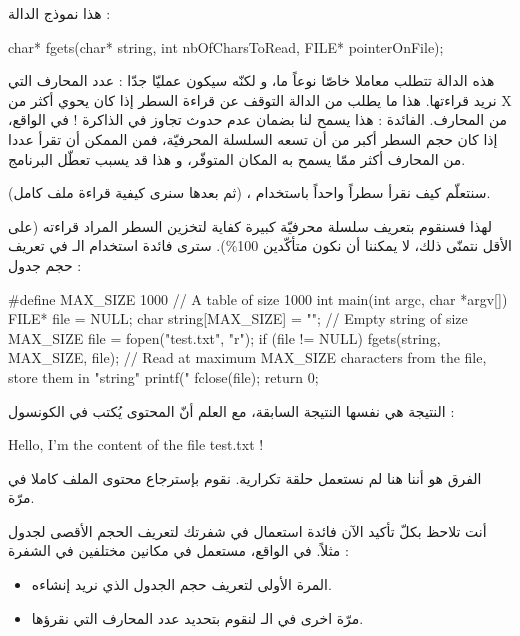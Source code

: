هذا نموذج الدالة :

\begin{Csource}
char* fgets(char* string, int nbOfCharsToRead, FILE* pointerOnFile);
\end{Csource}

هذه الدالة تتطلب معاملا خاصّا نوعاً ما، و لكنّه سيكون عمليّا جدّا : عدد المحارف التي نريد قراءتها. هذا ما يطلب من الدالة
التوقف عن قراءة السطر إذا كان يحوي أكثر من
\textenglish{X}
من المحارف.
الفائدة : هذا يسمح لنا بضمان عدم حدوث تجاوز في الذاكرة ! في الواقع، إذا كان حجم السطر أكبر من أن تسعه السلسلة المحرفيّة، فمن الممكن أن تقرأ عددا من المحارف أكثر ممّا يسمح به المكان المتوفّر، و هذا قد يسبب تعطّل البرنامج.

سنتعلّم كيف نقرأ سطراً واحداً باستخدام
،
(ثم  بعدها سنرى كيفية قراءة ملف كامل).

لهذا فسنقوم بتعريف سلسلة محرفيّة كبيرة كفاية لتخزين السطر المراد قراءته (على الأقل نتمنّى ذلك، لا يمكننا أن نكون متأكّدين
100\%).
سترى فائدة استخدام الـ
في تعريف حجم جدول :

\begin{Csource}
#define MAX_SIZE 1000 // A table of size 1000
int main(int argc, char *argv[])
{
    FILE* file = NULL;
    char string[MAX_SIZE] = ""; // Empty string of size MAX_SIZE
    file = fopen("test.txt", "r");
    if (file != NULL)
    {
        fgets(string, MAX_SIZE, file); // Read at maximum MAX_SIZE characters from the file, store them in  "string"
        printf("%
        fclose(file);
    }
    return 0;
}
\end{Csource}

النتيجة هي نفسها النتيجة السابقة، مع العلم أنّ المحتوى يُكتب في الكونسول :

\begin{Console}
Hello, I'm the content of the file test.txt !
\end{Console}

الفرق هو أننا هنا لم نستعمل حلقة تكرارية. نقوم بإسترجاع محتوى الملف كاملا في مرّة.

أنت تلاحظ بكلّ تأكيد الآن فائدة استعمال
في شفرتك لتعريف الحجم الأقصى لجدول مثلاً. في الواقع،
مستعمل في مكانين مختلفين في الشفرة :

\begin{itemize}
  \item المرة الأولى لتعريف حجم الجدول الذي نريد إنشاءه.
  \item مرّة اخرى في الـ
  لنقوم بتحديد عدد المحارف التي نقرؤها.
\end{itemize}

